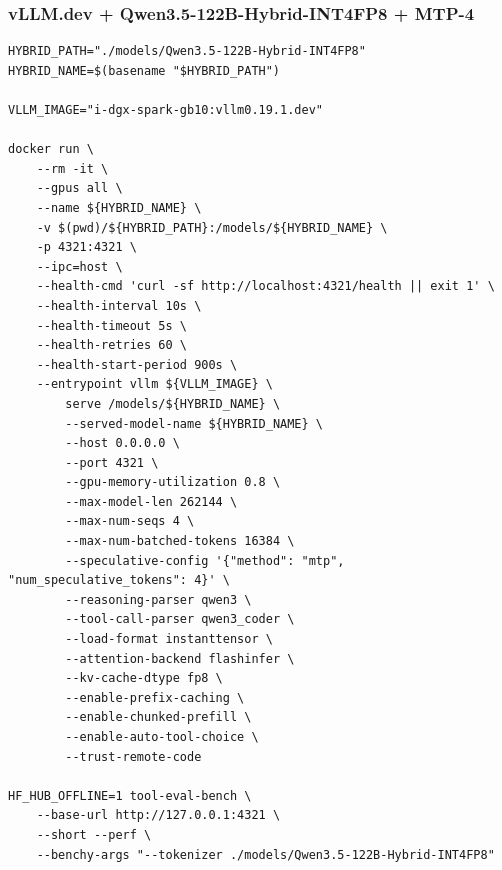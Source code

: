 \documentclass{article}
\begin{document}
\subsubsection{vLLM.dev + Qwen3.5-122B-Hybrid-INT4FP8 + MTP-4}
\begin{lstlisting}
HYBRID_PATH="./models/Qwen3.5-122B-Hybrid-INT4FP8"
HYBRID_NAME=$(basename "$HYBRID_PATH")

VLLM_IMAGE="i-dgx-spark-gb10:vllm0.19.1.dev"

docker run \
    --rm -it \
    --gpus all \
    --name ${HYBRID_NAME} \
    -v $(pwd)/${HYBRID_PATH}:/models/${HYBRID_NAME} \
    -p 4321:4321 \
    --ipc=host \
    --health-cmd 'curl -sf http://localhost:4321/health || exit 1' \
    --health-interval 10s \
    --health-timeout 5s \
    --health-retries 60 \
    --health-start-period 900s \
    --entrypoint vllm ${VLLM_IMAGE} \
        serve /models/${HYBRID_NAME} \
        --served-model-name ${HYBRID_NAME} \
        --host 0.0.0.0 \
        --port 4321 \
        --gpu-memory-utilization 0.8 \
        --max-model-len 262144 \
        --max-num-seqs 4 \
        --max-num-batched-tokens 16384 \
        --speculative-config '{"method": "mtp", "num_speculative_tokens": 4}' \
        --reasoning-parser qwen3 \
        --tool-call-parser qwen3_coder \
        --load-format instanttensor \
        --attention-backend flashinfer \
        --kv-cache-dtype fp8 \
        --enable-prefix-caching \
        --enable-chunked-prefill \
        --enable-auto-tool-choice \
        --trust-remote-code

HF_HUB_OFFLINE=1 tool-eval-bench \
    --base-url http://127.0.0.1:4321 \
    --short --perf \
    --benchy-args "--tokenizer ./models/Qwen3.5-122B-Hybrid-INT4FP8"
\end{lstlisting}
\end{document}
